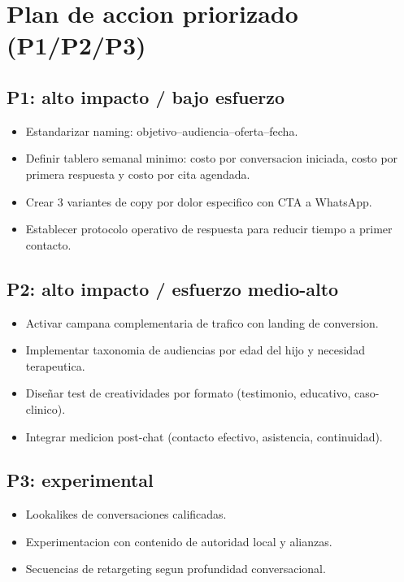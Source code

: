 \documentclass[9pt,a4paper,twocolumn,twoside]{tau-class/tau}
\begin{document}
\section{Plan de accion priorizado (P1/P2/P3)}

\subsection{P1: alto impacto / bajo esfuerzo}
\begin{itemize}
  \item Estandarizar naming: objetivo--audiencia--oferta--fecha.
  \item Definir tablero semanal minimo: costo por conversacion iniciada, costo por primera respuesta y costo por cita agendada.
  \item Crear 3 variantes de copy por dolor especifico con CTA a WhatsApp.
  \item Establecer protocolo operativo de respuesta para reducir tiempo a primer contacto.
\end{itemize}

\subsection{P2: alto impacto / esfuerzo medio-alto}
\begin{itemize}
  \item Activar campana complementaria de trafico con landing de conversion.
  \item Implementar taxonomia de audiencias por edad del hijo y necesidad terapeutica.
  \item Diseñar test de creatividades por formato (testimonio, educativo, caso-clinico).
  \item Integrar medicion post-chat (contacto efectivo, asistencia, continuidad).
\end{itemize}

\subsection{P3: experimental}
\begin{itemize}
  \item Lookalikes de conversaciones calificadas.
  \item Experimentacion con contenido de autoridad local y alianzas.
  \item Secuencias de retargeting segun profundidad conversacional.
\end{itemize}
\end{document}

